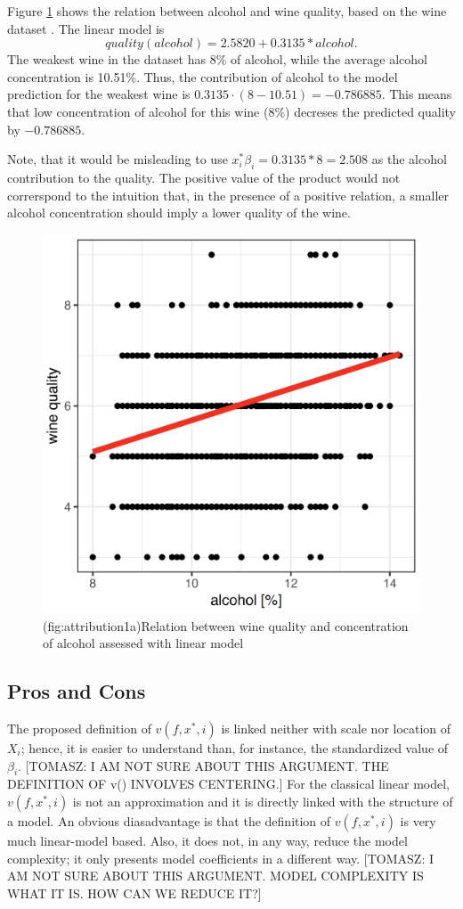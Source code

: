 \documentclass[]{krantz}
\theoremstyle{definition}
\theoremstyle{definition}
\theoremstyle{definition}
\theoremstyle{remark}
\begin{document}
Figure \ref{fig:attribution1a} shows the relation between alcohol and
wine quality, based on the wine dataset \citep{wine2009}. The linear
model is \[
quality(alcohol) = 2.5820 + 0.3135 * alcohol.
\] The weakest wine in the dataset has 8\% of alcohol, while the average
alcohol concentration is 10.51\%. Thus, the contribution of alcohol to
the model prediction for the weakest wine is
\(0.3135 \cdot (8-10.51) = -0.786885\). This means that low
concentration of alcohol for this wine (8\%) decreses the predicted
quality by \(-0.786885\).

Note, that it would be misleading to use
\(x_i^*\beta_i = 0.3135*8 = 2.508\) as the alcohol contribution to the
quality. The positive value of the product would not correrspond to the
intuition that, in the presence of a positive relation, a smaller
alcohol concentration should imply a lower quality of the wine.

\begin{figure}

{\centering \includegraphics[width=0.5\linewidth]{figure/attribution_1} 

}

\caption{(fig:attribution1a)Relation between wine quality and concentration of alcohol assessed with linear model}\label{fig:attribution1a}
\end{figure}

\hypertarget{pros-and-cons-1}{%
\subsection{Pros and Cons}\label{pros-and-cons-1}}

The proposed definition of \(v(f, x^*, i)\) is linked neither with scale
nor location of \(X_i\); hence, it is easier to understand than, for
instance, the standardized value of \(\beta_i\). {[}TOMASZ: I AM NOT
SURE ABOUT THIS ARGUMENT. THE DEFINITION OF v() INVOLVES CENTERING.{]}
For the classical linear model, \(v(f, x^*, i)\) is not an approximation
and it is directly linked with the structure of a model. An obvious
diasadvantage is that the definition of \(v(f, x^*, i)\) is very much
linear-model based. Also, it does not, in any way, reduce the model
complexity; it only presents model coefficients in a different way.
{[}TOMASZ: I AM NOT SURE ABOUT THIS ARGUMENT. MODEL COMPLEXITY IS WHAT
IT IS. HOW CAN WE REDUCE IT?{]}
\end{document}
